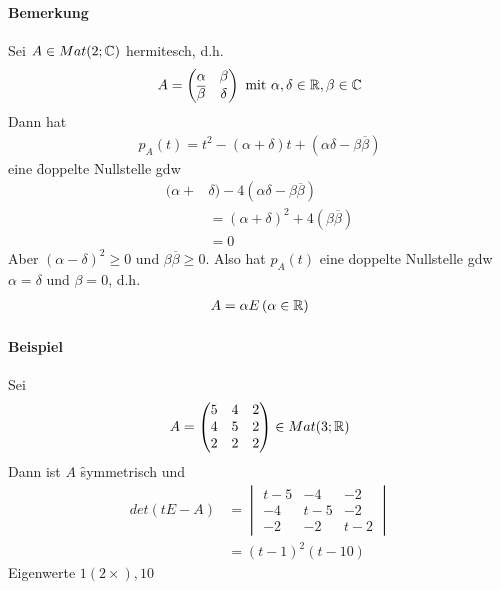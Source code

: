 \paragraph{Bemerkung}
Sei $A \in Mat(2; \mathbb{C})$ hermitesch, d.h.
\begin{align}
A = \begin{pmatrix} \alpha & \beta \\ \overline{\beta} & \delta \end{pmatrix} \text{ mit } \alpha, \delta \in \mathbb{R}, \beta \in \mathbb{C}
\end{align}
Dann hat
\begin{align}
p_A(t) = t^2 - (\alpha + \delta)t + (\alpha \delta - \beta\overline{\beta})
\end{align}
eine \f{doppelte} Nullstelle gdw
\begin{align}
(\alpha + &\delta) - 4(\alpha \delta - \beta \overline{\beta}) \\
&= (\alpha + \delta)^2 + 4 (\beta \overline{\beta}) \\
&= 0
\end{align}
Aber $(\alpha - \delta)^2 \geq 0$ und $\beta\overline{\beta} \geq 0$. Also hat $p_A(t)$ eine doppelte Nullstelle gdw $\alpha = \delta$ und $\beta = 0$, d.h.
\begin{align}
A = \alpha E\, (\alpha \in \mathbb{R})
\end{align}

\paragraph{Beispiel}
Sei
\begin{align}
A = \begin{pmatrix} 5 & 4 & 2 \\ 4 & 5 & 2 \\ 2 & 2 & 2 \end{pmatrix} \in Mat(3; \mathbb{R})
\end{align}
Dann ist $A$ \f{symmetrisch} und 
\begin{align}
det(t E - A) &= \begin{vmatrix} t-5 & -4 & -2 \\ -4 & t-5 & -2 \\ -2 & -2 & t-2\end{vmatrix} \\
&= (t-1)^2 (t-10)
\end{align}
Eigenwerte $1 (2\times), 10$

